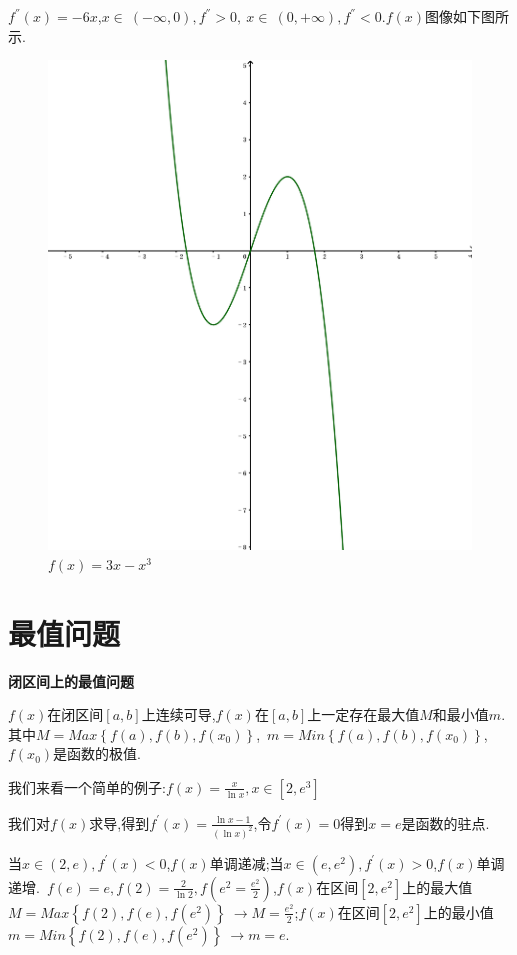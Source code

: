 \documentclass[oneside]{book}
\begin{document}
	$f^{''}(x)=-6x$,$x\in\ (-\infty,0),f^{''}>0,\ x\in\ (0,+\infty),f^{''}<0$.$f(x)$图像如下图所示.
	\begin{figure}[htbp]
		\centering
		\includegraphics{pictureone.png}
		\caption{$f(x)=3x-x^{3}$}
	\end{figure}
	\chapter{最值问题}
	\textbf{闭区间上的最值问题}
	
	$f(x)$在闭区间$[a,b]$上连续可导,$f(x)$在$[a,b]$上一定存在最大值$M$和最小值$m$.其中$M=Max \left\lbrace f(a),f(b),f(x_{0})\right\rbrace $,\ $m=Min \left\lbrace f(a),f(b),f(x_{0})\right\rbrace $,$f(x_{0})$是函数的极值.
	
	我们来看一个简单的例子:$f(x)=\frac{x}{\ln x},x\in [2,e^{3}]$
	
	我们对$f(x)$求导,得到$f^{'}(x)=\frac{\ln x-1}{(\ln x)^{2}}$,令$f^{'}(x)=0$得到$x=e$是函数的驻点.
	
	当$x\in (2,e),f^{'}(x)<0$,$f(x)$单调递减;当$x\in (e,e^{2}),f^{'}(x)>0$,$f(x)$单调递增.\ $f(e)=e,f(2)=\frac{2}{\ln 2},f(e^{2}=\frac{e^{2}}{2})$,$f(x)$在区间$[2,e^{2}]$上的最大值$M= Max\left\lbrace f(2),f(e),f(e^{2})\right\rbrace \ \rightarrow M=\frac{e^{2}}{2}$;$f(x)$在区间$[2,e^{2}]$上的最小值$m= Min\left\lbrace f(2),f(e),f(e^{2})\right\rbrace \ \rightarrow m=e$.
	
\end{document}
